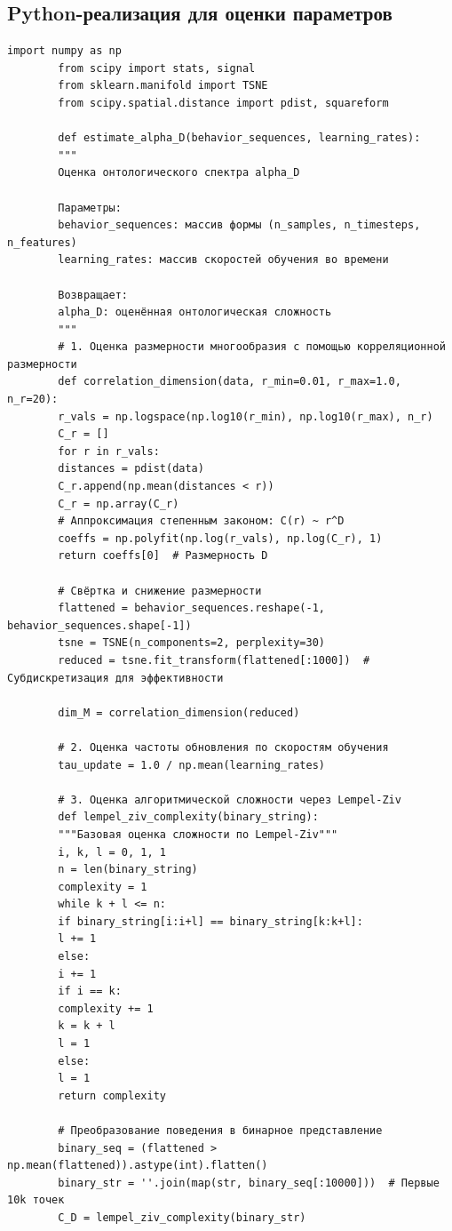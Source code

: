 \documentclass[12pt,a4paper]{article}
\begin{document}
	\subsection{Python-реализация для оценки параметров}
	
	\begin{lstlisting}[caption={Python-код для оценки параметров UCD по временным рядам}, label={lst:ucd-python}]
		import numpy as np
		from scipy import stats, signal
		from sklearn.manifold import TSNE
		from scipy.spatial.distance import pdist, squareform
		
		def estimate_alpha_D(behavior_sequences, learning_rates):
		"""
		Оценка онтологического спектра alpha_D
		
		Параметры:
		behavior_sequences: массив формы (n_samples, n_timesteps, n_features)
		learning_rates: массив скоростей обучения во времени
		
		Возвращает:
		alpha_D: оценённая онтологическая сложность
		"""
		# 1. Оценка размерности многообразия с помощью корреляционной размерности
		def correlation_dimension(data, r_min=0.01, r_max=1.0, n_r=20):
		r_vals = np.logspace(np.log10(r_min), np.log10(r_max), n_r)
		C_r = []
		for r in r_vals:
		distances = pdist(data)
		C_r.append(np.mean(distances < r))
		C_r = np.array(C_r)
		# Аппроксимация степенным законом: C(r) ~ r^D
		coeffs = np.polyfit(np.log(r_vals), np.log(C_r), 1)
		return coeffs[0]  # Размерность D
		
		# Свёртка и снижение размерности
		flattened = behavior_sequences.reshape(-1, behavior_sequences.shape[-1])
		tsne = TSNE(n_components=2, perplexity=30)
		reduced = tsne.fit_transform(flattened[:1000])  # Субдискретизация для эффективности
		
		dim_M = correlation_dimension(reduced)
		
		# 2. Оценка частоты обновления по скоростям обучения
		tau_update = 1.0 / np.mean(learning_rates)
		
		# 3. Оценка алгоритмической сложности через Lempel-Ziv
		def lempel_ziv_complexity(binary_string):
		"""Базовая оценка сложности по Lempel-Ziv"""
		i, k, l = 0, 1, 1
		n = len(binary_string)
		complexity = 1
		while k + l <= n:
		if binary_string[i:i+l] == binary_string[k:k+l]:
		l += 1
		else:
		i += 1
		if i == k:
		complexity += 1
		k = k + l
		l = 1
		else:
		l = 1
		return complexity
		
		# Преобразование поведения в бинарное представление
		binary_seq = (flattened > np.mean(flattened)).astype(int).flatten()
		binary_str = ''.join(map(str, binary_seq[:10000]))  # Первые 10k точек
		C_D = lempel_ziv_complexity(binary_str)
		

\end{lstlisting}
\end{document}
